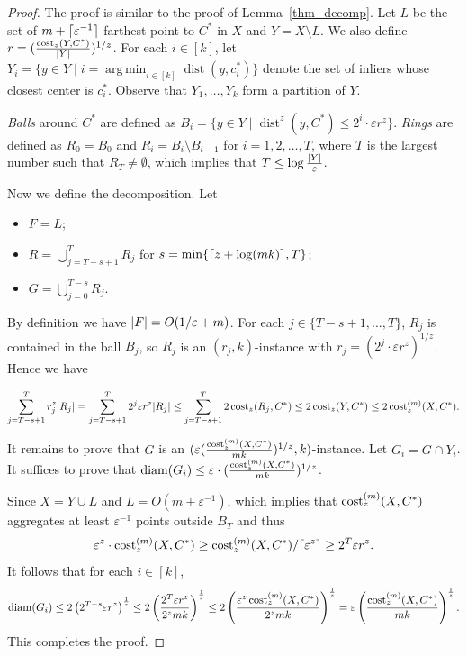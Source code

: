 \documentclass[11pt,letterpaper]{article}
\theoremstyle{definition}
\newcommand{\eps}{\varepsilon}
\DeclareMathOperator{\diam}{diam}
\DeclareMathOperator{\dist}{dist}
\DeclareMathOperator*{\argmin}{arg\,min}
\DeclarePairedDelimiter{\abs}{\lvert}{\rvert}
\DeclarePairedDelimiter{\ceil}{\lceil}{\rceil}
\begin{document}
\begin{proof}
    The proof is similar to the proof of Lemma~\ref{thm_decomp}. 
    Let $L$ be the set of $m+\ceil{\eps^{-1}}$ farthest point to $C^\ast$ in $X$ and $Y = X\setminus L$. We also define $r=(\frac{\cost_z(Y,C^\ast)}{\abs{Y}})^{1/z}$. For each $i\in [k]$, let $Y_i=\{y\in Y\mid i=\argmin_{i\in [k]}\dist(y,c_i^\ast)  \}$ denote the set of inliers whose closest center is $c_i^\ast$. Observe that $Y_1, \dots, Y_k$ form a partition of $Y$.

    \emph{Balls} around $C^\ast$ are defined as $B_i=\{y\in Y\mid \dist^z(y,C^\ast)\leq 2^i\cdot \eps r^z  \}$. \emph{Rings} are defined as $R_0=B_0$ and $R_i=B_i\setminus B_{i-1}$ for $i=1,2,\dots,T$, where $T$ is the largest number such that $R_T\neq\emptyset$, which implies that $T\leq \log{\frac{\abs{Y}}{\eps}}$.

    Now we define the decomposition. Let
    \begin{itemize}[itemsep=0pt]
        \item $F=L$;
        \item $R=\bigcup_{j=T-s+1}^T R_j$ for $s=\min\{\ceil{z + \log (mk)},T\}$;
        \item $G=\bigcup_{j=0}^{T-s} R_j$.
    \end{itemize}

    By definition we have $\abs{F}=O(1/\eps+m )$. For each $j\in \{T-s+1,\dots,T\}$, $R_j$ is contained in the ball $B_j$, so $R_j$ is an $(r_j,k)$-instance with $r_j=(2^j\cdot \eps r^z)^{1/z}$. Hence we have

    \[
    \sum_{j=T-s+1}^T r_j^z \abs{R_j} =\sum_{j=T-s+1}^T 2^j  \eps r^z   \abs{R_j} \leq \sum_{j=T-s+1}^T 2\cost_z(R_j,C^\ast) \leq 2\cost_z(Y,C^\ast) \leq 2\cost[m]_z(X,C^\ast).
    \]

    It remains to prove that $G$ is an $(\eps (\frac{\cost[m]_z(X,C^\ast)}{mk})^{1/z},k) $-instance. Let $G_i=G\cap  Y_i$. It suffices to prove that $\diam(G_i)\leq \eps \cdot  (\frac{\cost[m]_z(X,C^\ast)}{mk})^{1/z}$.

    Since $X=Y\cup L$ and $L=O(m+\eps^{-1})$, which implies that $\cost[m]_z(X,C^\ast)$ aggregates at least $\eps^{-1}$ points outside $B_T$ and thus
    \[
        \eps^{z} \cdot \cost[m]_z(X,C^\ast)\geq \cost[m]_z(X,C^\ast)/\ceil{\eps^{z}} \geq 2^T \eps r^z. 
    \]   
    It follows that for each $i\in [k]$,
	\[
	   \diam(G_i) \leq 2\left(2^{T-s} \eps r^z\right)^{\frac{1}{z}}\leq 2 \left(\frac{2^T \eps r^z}{2^z mk}\right)^{\frac{1}{z}}\leq 2\left(\frac{\eps^z \cost[m]_z(X,C^\ast)}{2^zmk} \right)^{\frac{1}{z}} 
       = \eps\left( \frac{\cost[m]_z(X,C^\ast)}{mk} \right)^{\frac{1}{z}}.
	\]
    This completes the proof.
\end{proof}
\end{document}
